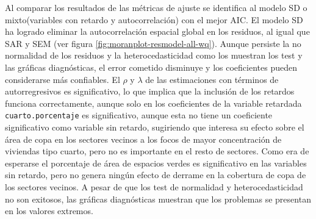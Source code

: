 \documentclass[12pt,]{book}
\begin{document}
Al comparar los resultados de las métricas de ajuste se identifica al
modelo SD o mixto(variables con retardo y autocorrelación) con el mejor
AIC. El modelo SD ha logrado eliminar la autocorrelación espacial global
en los residuos, al igual que SAR y SEM (ver figura
\ref{fig:moranplot-resmodel-all-wq}). Aunque persiste la no normalidad
de los residuos y la heterocedasticidad como los muestran los test y las
gráficas diagnósticas, el error cometido disminuye y los coeficientes
pueden considerarse más confiables. El \(\rho\) y \(\lambda\) de las
estimaciones con términos de autorregresivos es significativo, lo que
implica que la inclusión de los retardos funciona correctamente, aunque
solo en los coeficientes de la variable retardada
\texttt{cuarto.porcentaje} es significativo, aunque esta no tiene un
coeficiente significativo como variable sin retardo, sugiriendo que
interesa su efecto sobre el área de copa en los sectores vecinos a los
focos de mayor concentración de viviendas tipo cuarto, pero no es
importante en el resto de sectores. Como era de esperarse el porcentaje
de área de espacios verdes es significativo en las variables sin
retardo, pero no genera ningún efecto de derrame en la cobertura de copa
de los sectores vecinos. A pesar de que los test de normalidad y
heterocedasticidad no son exitosos, las gráficas diagnósticas muestran
que los problemas se presentan en los valores extremos.
\end{document}
